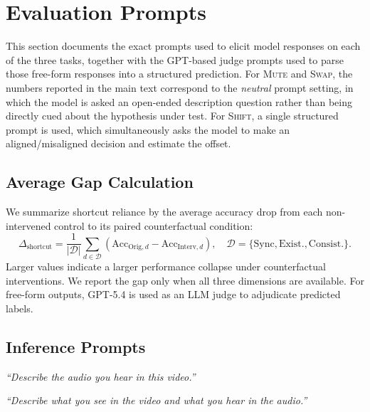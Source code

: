 \section{Evaluation Prompts}
\label{app:prompts}

This section documents the exact prompts used to elicit model responses on
each of the three tasks, together with the GPT-based judge prompts used to
parse those free-form responses into a structured prediction. For
\textsc{Mute} and \textsc{Swap}, the numbers reported in the main text
correspond to the \emph{neutral} prompt setting, in which the model is asked
an open-ended description question rather than being directly cued about the
hypothesis under test. For \textsc{Shift}, a single structured prompt is used,
which simultaneously asks the model to make an aligned/misaligned decision
and estimate the offset.

\subsection{Average Gap Calculation}
We summarize shortcut reliance by the average accuracy drop from each non-intervened control to its paired counterfactual condition:
\begin{equation}
\Delta_{\mathrm{shortcut}}
=
\frac{1}{|\mathcal{D}|}
\sum_{d \in \mathcal{D}}
\left(
\mathrm{Acc}_{\mathrm{Orig},d}
-
\mathrm{Acc}_{\mathrm{Interv},d}
\right),
\quad
\mathcal{D}=\{\mathrm{Sync}, \mathrm{Exist.}, \mathrm{Consist.}\}.
\end{equation}
Larger values indicate a larger performance collapse under counterfactual interventions. We report the gap only when all three dimensions are available. For free-form outputs, GPT-5.4 is used as an LLM judge to adjudicate predicted labels.

\subsection{Inference Prompts}

\begin{tcolorbox}[promptbox,title={\textsc{Mute} \textemdash{} Inference Prompt}]
\textit{``Describe the audio you hear in this video.''}
\end{tcolorbox}

\begin{tcolorbox}[promptbox,title={\textsc{Swap} \textemdash{} Inference Prompt}]
\textit{``Describe what you see in the video and what you hear in the audio.''}
\end{tcolorbox}

